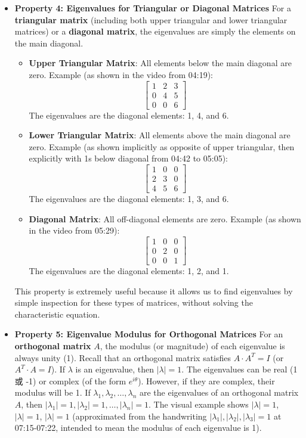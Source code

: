 \documentclass{article}
\begin{document}
\begin{itemize}
    \item \textbf{Property 4: Eigenvalues for Triangular or Diagonal Matrices}
    For a \textbf{triangular matrix} (including both upper triangular and lower triangular matrices) or a \textbf{diagonal matrix}, the eigenvalues are simply the elements on the main diagonal.
    \begin{itemize}
        \item \textbf{Upper Triangular Matrix}: All elements below the main diagonal are zero.
        Example (as shown in the video from 04:19):
        \[ \begin{bmatrix} 1 & 2 & 3 \\ 0 & 4 & 5 \\ 0 & 0 & 6 \end{bmatrix} \]
        The eigenvalues are the diagonal elements: 1, 4, and 6.
        \item \textbf{Lower Triangular Matrix}: All elements above the main diagonal are zero.
        Example (as shown implicitly as opposite of upper triangular, then explicitly with 1s below diagonal from 04:42 to 05:05):
        \[ \begin{bmatrix} 1 & 0 & 0 \\ 2 & 3 & 0 \\ 4 & 5 & 6 \end{bmatrix} \]
        The eigenvalues are the diagonal elements: 1, 3, and 6.
        \item \textbf{Diagonal Matrix}: All off-diagonal elements are zero.
        Example (as shown in the video from 05:29):
        \[ \begin{bmatrix} 1 & 0 & 0 \\ 0 & 2 & 0 \\ 0 & 0 & 1 \end{bmatrix} \]
        The eigenvalues are the diagonal elements: 1, 2, and 1.
    \end{itemize}
    This property is extremely useful because it allows us to find eigenvalues by simple inspection for these types of matrices, without solving the characteristic equation.

    \item \textbf{Property 5: Eigenvalue Modulus for Orthogonal Matrices}
    For an \textbf{orthogonal matrix} $A$, the modulus (or magnitude) of each eigenvalue is always unity (1). Recall that an orthogonal matrix satisfies $A \cdot A^T = I$ (or $A^T \cdot A = I$). If $\lambda$ is an eigenvalue, then $| \lambda | = 1$. The eigenvalues can be real (1 或 -1) or complex (of the form $e^{i\theta}$). However, if they are complex, their modulus will be 1.
    If $\lambda_1, \lambda_2, \dots, \lambda_n$ are the eigenvalues of an orthogonal matrix $A$, then $|\lambda_1|=1, |\lambda_2|=1, \dots, |\lambda_n|=1$. The visual example shows $|\lambda|=1$, $|\lambda|=1$, $|\lambda|=1$ (approximated from the handwriting $\left|\lambda_{1}\right|,\left|\lambda_{2}\right|,\left|\lambda_{3}\right|=1$ at 07:15-07:22, intended to mean the modulus of each eigenvalue is 1).


\end{itemize}
\end{document}
